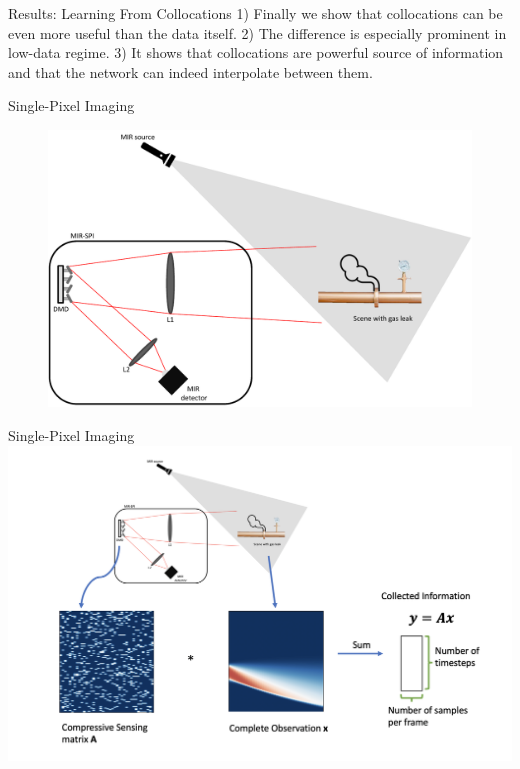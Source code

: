 \documentclass[8pt]{beamer}
\begin{document}
\begin{frame}{Results: Learning From Collocations}
1) Finally we show that collocations can be even more useful than the data itself.
2) The difference is especially prominent in low-data regime.
3) It shows that collocations are powerful source of information and that the network can indeed interpolate between them.
\end{frame}

\begin{frame}{Single-Pixel Imaging}
\begin{figure}
	\includegraphics[width=\textwidth]{Figures/SPI_setup.pdf}
\end{figure}
\end{frame}

\begin{frame}{Single-Pixel Imaging}
	\includegraphics[width=\textwidth]{Figures/spi_math.png}
\end{frame}
\end{document}
